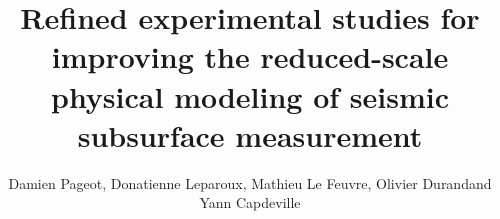 \documentclass[manuscript,revised]{geophysics}
\begin{document}
\title{Refined experimental studies for improving the reduced-scale physical modeling of seismic subsurface measurement}

\renewcommand{\thefootnote}{\fnsymbol{footnote}} 


\address{
\footnotemark[1]LUNAM-IFSTTAR, \\
\footnotemark[2]OSUNA \\
\footnotemark[1]LPGN, \\}
\author{Damien Pageot\footnotemark[1]\footnotemark[2], Donatienne Leparoux\footnotemark[1], Mathieu Le Feuvre\footnotemark[1], Olivier Durand\footnotemark[1] and Yann Capdeville\footnotemark[3]}


\maketitle
\end{document}
